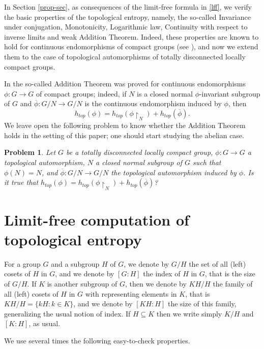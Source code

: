 \documentclass[11pt]{article}
\newtheorem{problem}[theorem]{Problem}
\theoremstyle{definition}
\numberwithin{equation}{section}
\begin{document}
\smallskip
In Section \ref{prop-sec}, as consequences of the limit-free formula in \eqref{lff}, we verify the basic properties of the topological entropy, namely, the so-called Invariance under conjugation, Monotonicity, Logarithmic law, Continuity with respect to inverse limits and weak Addition Theorem. Indeed, these properties are known to hold for continuous endomorphisms of compact groups (see \cite{AKM,St}), and now we extend them to the case of topological automorphisms of totally disconnected locally compact groups.

\medskip
In \cite{St} the so-called Addition Theorem was proved for continuous endomorphisms $\phi:G\to G$ of compact groups; indeed, if $N$ is a closed normal $\phi$-invariant subgroup of $G$ and $\overline \phi:G/N\to G/N$ is the continuous endomorphism induced by $\phi$, then $$h_{top}(\phi)=h_{top}(\phi\restriction_N)+h_{top}(\overline\phi).$$
We leave open the following problem to know whether the Addition Theorem holds in the setting of this paper; one should start studying the abelian case.

\begin{problem}
Let $G$ be a totally disconnected locally compact group, $\phi:G\to G$ a topological automorphism, $N$ a closed normal subgroup of $G$ such that $\phi(N)=N$, and $\overline\phi:G/N\to G/N$ the topological automorphism induced by $\phi$. Is it true that $h_{top}(\phi)=h_{top}(\phi\restriction_N)+h_{top}(\overline\phi)$? 
\end{problem}



\section{Limit-free computation of topological entropy}\label{lf-sec}

For a group $G$ and a subgroup $H$ of $G$, we denote by $G/H$ the set of all (left) cosets of $H$ in $G$, and we denote by $[G:H]$ the index of $H$ in $G$, that is the size of $G/H$. If $K$ is another subgroup of $G$, then we denote by $KH/H$ the family of all (left) cosets of $H$ in $G$ with representing elements in $K$, that is $KH/H=\{kH:k\in K\}$, and we denote by $[KH:H]$ the size of this family, generalizing the usual notion of index. If $H\subseteq K$ then we write simply $K/H$ and $[K:H]$, as usual.

We use several times the following easy-to-check properties. %
\end{document}
